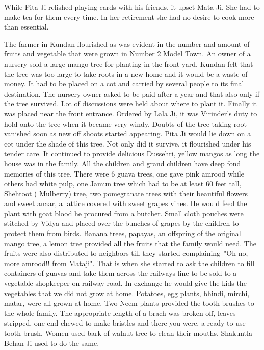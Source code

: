 While Pita Ji relished playing cards with his friends, it upset Mata Ji. She had to make tea for them every time. In her retirement she had no desire to cook more than essential. 

The farmer in Kundan flourished as was evident in the number and amount of fruits and vegetable that were grown in Number 2 Model Town. An owner of a nursery sold a large mango tree for planting in the front yard. Kundan felt that the tree was too large to take roots in a new home and it would be a waste of money. It had to be placed on a cot and carried by several people to its final destination. The nursery owner asked to be paid after a year and that also only if the tree survived. Lot of discussions were held about where to plant it. Finally it was placed near the front entrance. Ordered by Lala Ji, it was Virinder’s duty to hold onto the tree when it became very windy. Doubts of the tree taking root vanished soon as new off shoots started appearing. Pita Ji would lie down on a cot under the shade of this tree. Not only did it survive, it flourished under his tender care. It continued to provide delicious Dussehri, yellow mangos as long the house was in the family. All the children and grand children have deep fond memories of this tree. There were 6 guava trees, one gave pink amrood while others had white pulp, one Jamun tree which had to be at least 60 feet tall, Shehtoot ( Mulberry) tree, two pomegranate trees with their beautiful flowers and sweet anaar, a lattice covered with sweet grapes vines. He would feed the plant with goat blood he procured from a butcher. Small cloth pouches were stitched by Vidya and placed over the bunches of grapes by the children to protect them from birds. Banana trees, papayas, an offspring of the original mango tree, a lemon tree provided all the fruits that the family would need. The fruits were also distributed to neighbors till they started complaining--"Oh no, more amrood!! from Mataji". That is when she started to ask the children to fill containers of guavas and take them across the railways line to be sold to a vegetable shopkeeper on railway road. In exchange he would give the kids the vegetables that we did not grow at home. Potatoes, egg plants, bhindi, mirchi, matar, were all grown at home. Two Neem plants provided the tooth brushes to the whole family. The appropriate length of a brach was broken off, leaves stripped, one end chewed to make bristles and there you were, a ready to use tooth brush. Women used bark of walnut tree to clean their mouths. Shakuntla Behan Ji used to do the same. 

